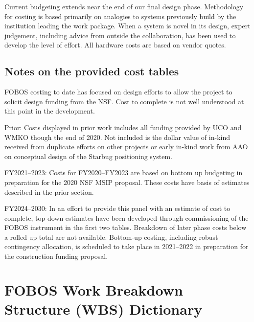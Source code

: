 \documentclass[oneside,11pt]{amsart}
\begin{document}
Current budgeting extends near the end of our final design phase.
Methodology for costing is based primarily on analogies to systems
previously build by the institution leading the work package. When a
system is novel in its design, expert judgement, including advice
from outside the collaboration, has been used to develop the level of
effort. All hardware costs are based on vendor quotes.

\subsection{Notes on the provided cost tables}

FOBOS costing to date has focused on design efforts to allow the
project to solicit design funding from the NSF. Cost to complete is
not well understood at this point in the development.

\noindent Prior: Costs displayed in prior work includes all funding
provided by UCO and WMKO though the end of 2020. Not included is the
dollar value of in-kind received from duplicate efforts on other
projects or early in-kind work from AAO on conceptual design of the
Starbug positioning system.

\noindent FY2021--2023: Costs for FY2020--FY2023 are based on
bottom up budgeting in preparation for the 2020 NSF MSIP proposal.
These costs have basis of estimates described in the prior section.

\noindent FY2024--2030: In an effort to provide this panel with an
estimate of cost to complete, top down estimates have been developed
through commissioning of the FOBOS instrument in the first two
tables. Breakdown of later phase costs below a rolled up total are
not available. Bottom-up costing, including robust contingency
allocation, is scheduled to take place in 2021--2022 in preparation
for the construction funding proposal.


\begin{multicols}{2}
\scriptsize


\end{multicols}

\newpage

\setcounter{page}{1}
\section*{FOBOS Work Breakdown Structure (WBS) Dictionary}
\end{document}

